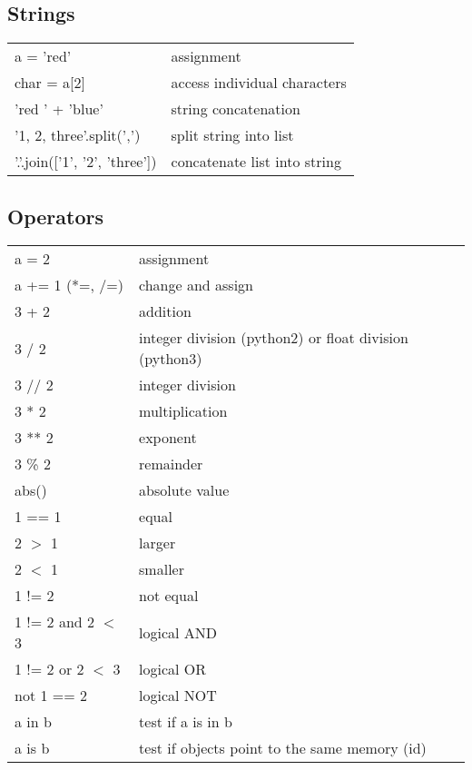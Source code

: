 \documentclass[10pt, a4paper, twocolumn]{article}
\begin{document}
\subsection*{Strings}
\begin{tabular}{ p{} p{} }
    a = 'red' & assignment\\
  char = a[2] & access individual characters\\
  'red ' + 'blue' & string concatenation\\
  '1, 2, three'.split(',') & split string into list\\
  '.'.join(['1', '2', 'three']) & concatenate list into string\\
\end{tabular}

\subsection*{Operators}
\begin{tabular}{ p{} p{} }
 a = 2 & assignment\\
 a += 1 (*=, /=) & change and assign\\
 3 + 2 & addition\\
 3 / 2 & integer division (python2) or float division (python3)\\
 3 // 2 & integer division\\
 3 * 2 & multiplication\\
 3 ** 2 & exponent\\
 3 \% 2 & remainder\\
 abs() & absolute value\\
 1 == 1 & equal\\
 2 $>$ 1 & larger\\
 2 $<$ 1 & smaller\\
1 != 2 & not equal\\
 1 != 2 and 2 $<$ 3 & logical AND\\
 1 != 2 or 2 $<$ 3 & logical OR\\
 not 1 == 2 & logical NOT\\
 a in b & test if a is in b\\
 a is b & test if objects point to the same memory (id)\\[1pt]
\end{tabular}
\end{document}
